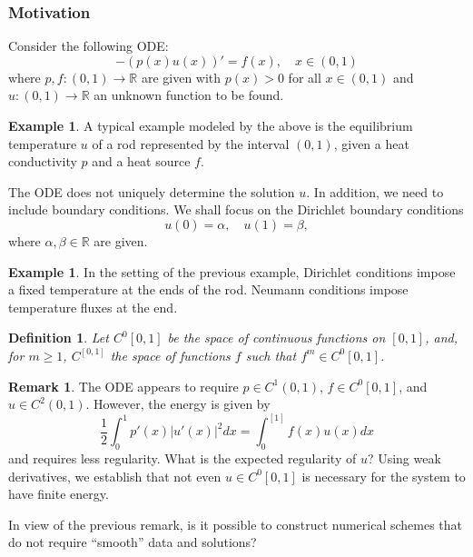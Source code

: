 \documentclass{article}
\newtheorem{definition}[theorem]{Definition}
\theoremstyle{definition}
\newtheorem{example}[theorem]{Example}
\theoremstyle{definition}
\newtheorem{remark}[theorem]{Remark}
\newcommand{\R}{\mathbb{R}}
\begin{document}
\subsubsection{Motivation}
Consider the following ODE:
$$-(p(x)u(x))'=f(x),\quad x\in (0,1)$$
where $p,f:(0,1)\to \R$ are given with $p(x)>0$ for all $x\in (0,1)$ and $u:(0,1)\to \R$ an unknown function to be found.
\begin{example}
    A typical example modeled by the above is the equilibrium temperature
$u$ of a rod represented by the interval $(0, 1)$, given a heat conductivity $p$ and a
heat source $f$.
\end{example}
The ODE does not uniquely determine the solution $u$. In addition, we need to include boundary conditions. We shall focus on the Dirichlet boundary conditions
$$u(0)=\alpha,\quad u(1)=\beta,$$
where $\alpha,\beta\in\R$ are given.
\begin{example}
    In the setting of the previous example, Dirichlet conditions impose a fixed temperature at the ends of the rod. Neumann conditions impose temperature fluxes at the end.
\end{example}

\begin{definition}
    Let $C^0[0,1]$ be the space of continuous functions on $[0,1]$, and, for $m\geq 1$, $C^[0,1]$ the space of functions $f$ such that $f^m\in C^0[0,1]$.
\end{definition}
\begin{remark}
    The ODE appears to require $p\in C^1(0,1)$, $f\in C^0[0,1]$, and $u\in C^2(0,1)$. However, the energy is given by
    $$\frac{1}{2}\int_{0}^{1}p'(x)|u'(x)|^2dx=\int_{0}^[1]f(x)u(x)dx$$
    and requires less regularity. What is the expected regularity of $u$? Using weak derivatives, we establish that not even $u\in C^0[0,1]$ is necessary for the system to have finite energy.
\end{remark}
In view of the previous remark, is it possible to construct numerical schemes
that do not require “smooth” data and solutions?
\end{document}
